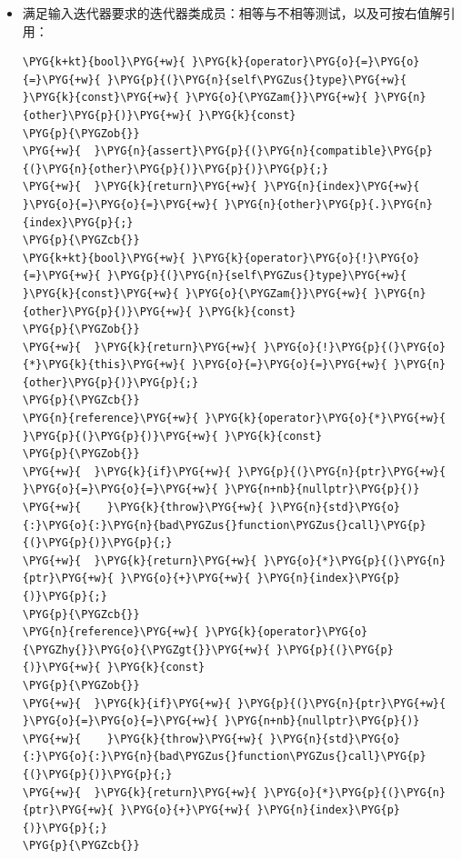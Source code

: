 \begin{itemize}

\item 满足输入迭代器要求的迭代器类成员：相等与不相等测试，以及可按右值解引用：



\begin{codeblockbg}
\begin{Verbatim}[commandchars=\\\{\},breaklines=true,breakanywhere=true,fontsize=\codefont,xleftmargin=17bp]
\PYG{k+kt}{bool}\PYG{+w}{ }\PYG{k}{operator}\PYG{o}{=}\PYG{o}{=}\PYG{+w}{ }\PYG{p}{(}\PYG{n}{self\PYGZus{}type}\PYG{+w}{ }\PYG{k}{const}\PYG{+w}{ }\PYG{o}{\PYGZam{}}\PYG{+w}{ }\PYG{n}{other}\PYG{p}{)}\PYG{+w}{ }\PYG{k}{const}
\PYG{p}{\PYGZob{}}
\PYG{+w}{  }\PYG{n}{assert}\PYG{p}{(}\PYG{n}{compatible}\PYG{p}{(}\PYG{n}{other}\PYG{p}{)}\PYG{p}{)}\PYG{p}{;}
\PYG{+w}{  }\PYG{k}{return}\PYG{+w}{ }\PYG{n}{index}\PYG{+w}{ }\PYG{o}{=}\PYG{o}{=}\PYG{+w}{ }\PYG{n}{other}\PYG{p}{.}\PYG{n}{index}\PYG{p}{;}
\PYG{p}{\PYGZcb{}}
\PYG{k+kt}{bool}\PYG{+w}{ }\PYG{k}{operator}\PYG{o}{!}\PYG{o}{=}\PYG{+w}{ }\PYG{p}{(}\PYG{n}{self\PYGZus{}type}\PYG{+w}{ }\PYG{k}{const}\PYG{+w}{ }\PYG{o}{\PYGZam{}}\PYG{+w}{ }\PYG{n}{other}\PYG{p}{)}\PYG{+w}{ }\PYG{k}{const}
\PYG{p}{\PYGZob{}}
\PYG{+w}{  }\PYG{k}{return}\PYG{+w}{ }\PYG{o}{!}\PYG{p}{(}\PYG{o}{*}\PYG{k}{this}\PYG{+w}{ }\PYG{o}{=}\PYG{o}{=}\PYG{+w}{ }\PYG{n}{other}\PYG{p}{)}\PYG{p}{;}
\PYG{p}{\PYGZcb{}}
\PYG{n}{reference}\PYG{+w}{ }\PYG{k}{operator}\PYG{o}{*}\PYG{+w}{ }\PYG{p}{(}\PYG{p}{)}\PYG{+w}{ }\PYG{k}{const}
\PYG{p}{\PYGZob{}}
\PYG{+w}{  }\PYG{k}{if}\PYG{+w}{ }\PYG{p}{(}\PYG{n}{ptr}\PYG{+w}{ }\PYG{o}{=}\PYG{o}{=}\PYG{+w}{ }\PYG{n+nb}{nullptr}\PYG{p}{)}
\PYG{+w}{    }\PYG{k}{throw}\PYG{+w}{ }\PYG{n}{std}\PYG{o}{:}\PYG{o}{:}\PYG{n}{bad\PYGZus{}function\PYGZus{}call}\PYG{p}{(}\PYG{p}{)}\PYG{p}{;}
\PYG{+w}{  }\PYG{k}{return}\PYG{+w}{ }\PYG{o}{*}\PYG{p}{(}\PYG{n}{ptr}\PYG{+w}{ }\PYG{o}{+}\PYG{+w}{ }\PYG{n}{index}\PYG{p}{)}\PYG{p}{;}
\PYG{p}{\PYGZcb{}}
\PYG{n}{reference}\PYG{+w}{ }\PYG{k}{operator}\PYG{o}{\PYGZhy{}}\PYG{o}{\PYGZgt{}}\PYG{+w}{ }\PYG{p}{(}\PYG{p}{)}\PYG{+w}{ }\PYG{k}{const}
\PYG{p}{\PYGZob{}}
\PYG{+w}{  }\PYG{k}{if}\PYG{+w}{ }\PYG{p}{(}\PYG{n}{ptr}\PYG{+w}{ }\PYG{o}{=}\PYG{o}{=}\PYG{+w}{ }\PYG{n+nb}{nullptr}\PYG{p}{)}
\PYG{+w}{    }\PYG{k}{throw}\PYG{+w}{ }\PYG{n}{std}\PYG{o}{:}\PYG{o}{:}\PYG{n}{bad\PYGZus{}function\PYGZus{}call}\PYG{p}{(}\PYG{p}{)}\PYG{p}{;}
\PYG{+w}{  }\PYG{k}{return}\PYG{+w}{ }\PYG{o}{*}\PYG{p}{(}\PYG{n}{ptr}\PYG{+w}{ }\PYG{o}{+}\PYG{+w}{ }\PYG{n}{index}\PYG{p}{)}\PYG{p}{;}
\PYG{p}{\PYGZcb{}}
\end{Verbatim}
\end{codeblockbg}



\end{itemize}
